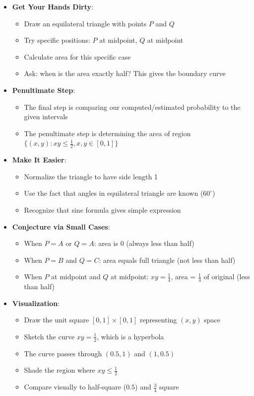 \documentclass[11pt]{article}
\begin{document}
\begin{strategicbox}
\begin{itemize}[leftmargin=*]
    \item \textbf{Get Your Hands Dirty}: 
    \begin{itemize}
        \item Draw an equilateral triangle with points $P$ and $Q$
        \item Try specific positions: $P$ at midpoint, $Q$ at midpoint
        \item Calculate area for this specific case
        \item Ask: when is the area exactly half? This gives the boundary curve
    \end{itemize}
    
    \item \textbf{Penultimate Step}: 
    \begin{itemize}
        \item The final step is comparing our computed/estimated probability to the given intervals
        \item The penultimate step is determining the area of region $\{(x,y): xy \leq \frac{1}{2}, x,y \in [0,1]\}$
    \end{itemize}
    
    \item \textbf{Make It Easier}: 
    \begin{itemize}
        \item Normalize the triangle to have side length 1
        \item Use the fact that angles in equilateral triangle are known ($60^\circ$)
        \item Recognize that sine formula gives simple expression
    \end{itemize}
    
    \item \textbf{Conjecture via Small Cases}: 
    \begin{itemize}
        \item When $P = A$ or $Q = A$: area is 0 (always less than half)
        \item When $P = B$ and $Q = C$: area equals full triangle (not less than half)
        \item When $P$ at midpoint and $Q$ at midpoint: $xy = \frac{1}{4}$, area = $\frac{1}{4}$ of original (less than half)
    \end{itemize}
    
    \item \textbf{Visualization}: 
    \begin{itemize}
        \item Draw the unit square $[0,1] \times [0,1]$ representing $(x,y)$ space
        \item Sketch the curve $xy = \frac{1}{2}$, which is a hyperbola
        \item The curve passes through $(0.5, 1)$ and $(1, 0.5)$
        \item Shade the region where $xy \leq \frac{1}{2}$
        \item Compare visually to half-square ($0.5$) and $\frac{3}{4}$ square
    \end{itemize}
\end{itemize}


\end{strategicbox}
\end{document}
